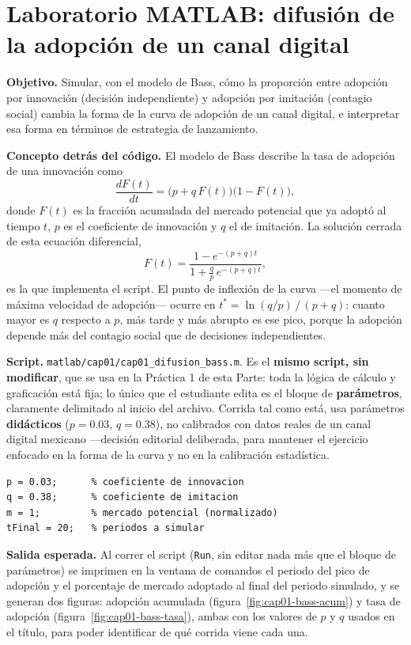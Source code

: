 \section{Laboratorio MATLAB: difusión de la adopción de un canal digital}

\begin{cajaLaboratorio}
\textbf{Objetivo.} Simular, con el modelo de Bass, cómo la proporción entre
adopción por innovación (decisión independiente) y adopción por imitación
(contagio social) cambia la forma de la curva de adopción de un canal
digital, e interpretar esa forma en términos de estrategia de lanzamiento.

\textbf{Concepto detrás del código.} El modelo de Bass \parencite{bass1969}
describe la tasa de adopción de una innovación como
\[
  \frac{dF(t)}{dt} = \big(p + q\,F(t)\big)\big(1 - F(t)\big),
\]
donde $F(t)$ es la fracción acumulada del mercado potencial que ya adoptó al
tiempo $t$, $p$ es el coeficiente de innovación y $q$ el de imitación. La
solución cerrada de esta ecuación diferencial,
\[
  F(t) = \frac{1 - e^{-(p+q)t}}{1 + \tfrac{q}{p}\,e^{-(p+q)t}},
\]
es la que implementa el script. El punto de inflexión de la curva —el
momento de máxima velocidad de adopción— ocurre en
$t^\ast = \ln(q/p)\,/\,(p+q)$: cuanto mayor es $q$ respecto a $p$, más tarde y
más abrupto es ese pico, porque la adopción depende más del contagio social
que de decisiones independientes.

\textbf{Script.} \texttt{matlab/cap01/cap01\_difusion\_bass.m}. Es el
\textbf{mismo script, sin modificar}, que se usa en la Práctica 1 de esta
Parte: toda la lógica de cálculo y graficación está fija; lo único que el
estudiante edita es el bloque de \textbf{parámetros}, claramente delimitado
al inicio del archivo. Corrida tal como está, usa parámetros
\textbf{didácticos} ($p=0.03$, $q=0.38$), no calibrados con datos reales de
un canal digital mexicano —decisión editorial deliberada, para mantener el
ejercicio enfocado en la forma de la curva y no en la calibración
estadística.

\begin{lstlisting}[style=MATLABStyle, caption={Bloque de parámetros editable (\texttt{cap01\_difusion\_bass.m}) — es lo único que cambia entre corridas.}]
p = 0.03;      % coeficiente de innovacion
q = 0.38;      % coeficiente de imitacion
m = 1;         % mercado potencial (normalizado)
tFinal = 20;   % periodos a simular
\end{lstlisting}

\textbf{Salida esperada.} Al correr el script (\texttt{Run}, sin editar nada
más que el bloque de parámetros) se imprimen en la ventana de comandos el
periodo del pico de adopción y el porcentaje de mercado adoptado al final del
periodo simulado, y se generan dos figuras: adopción acumulada
(figura~\ref{fig:cap01-bass-acum}) y tasa de adopción
(figura~\ref{fig:cap01-bass-tasa}), ambas con los valores de $p$ y $q$
usados en el título, para poder identificar de qué corrida viene cada una.


\end{cajaLaboratorio}
